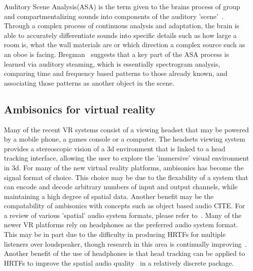 \documentclass[paper=a4, fontsize=10pt, font=arial]{scrartcl} %
\numberwithin{equation}{section} %
\numberwithin{figure}{section} %
\numberwithin{table}{section} %
\begin{document}
Auditory Scene Analysis(ASA) is the term given to the brains process of group and compartmentalizing sounds into components of the auditory 'scene'~\cite{rumsey2012spatial}. Through a complex process of continuous analysis and adaptation, the brain is able to accurately differentiate sounds into specific details such as how large a room is, what the wall materials are or which direction a complex source such as an oboe is facing. Bregman~\cite{Bregman1994} suggests that a key part of the ASA process is learned via auditory steaming, which is essentially spectrogram analysis, comparing time and frequency based patterns to those already known, and associating those patterns as another object in the scene. 
\subsection{Ambisonics for virtual reality}

Many of the recent VR systems consist of a viewing headset that may be powered by a mobile phone, a games console or a computer. The headsets viewing system provides a stereoscopic vision of a 3d environment that is linked to a head tracking interface, allowing the user to explore the 'immersive' visual environment in 3d. For many of the new virtual reality platforms, ambisonics has become the signal format of choice. This choice may be due to the flexability of a system that can encode and decode arbitrary numbers of input and output channels, while maintaining a high degree of spatial data. Another benefit may be the compatability of ambisonics with concepts such as object based audio CITE. For a review of various 'spatial' audio system formats, please refer to~\cite{Wiggins2004}. Many of the newer VR platforms rely on headphones as the preferred audio system format. This may be in part due to the difficulty in producing HRTFs for multiple listeners over loudspeaker, though research in this area is continually improving~\cite{Galvez2016}. Another benefit of the use of headphones is that head tracking can be applied to HRTFs to improve the spatial audio quality~\cite{Inanaga1995} in a relatively discrete package.   \\
\end{document}
